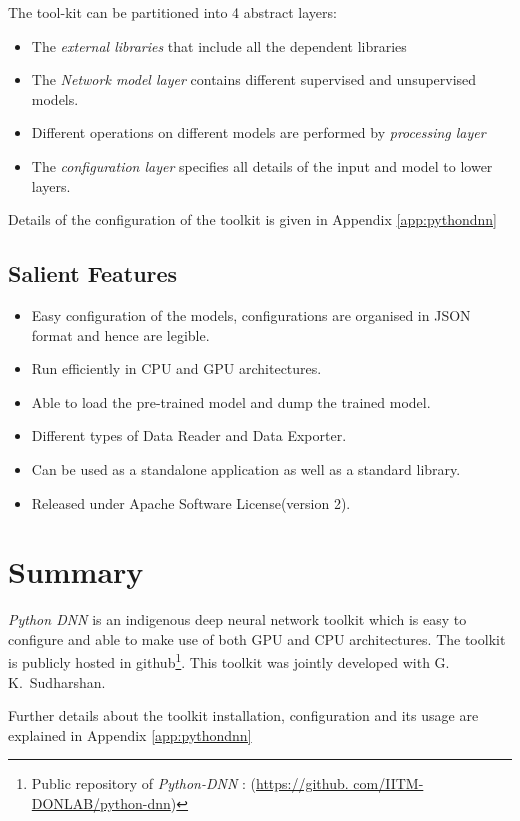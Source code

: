 \noindent The tool-kit can be partitioned into 4 abstract layers:
\begin{itemize}
\item The \textit{external libraries} that include all the dependent libraries
\item The \textit{Network model layer} contains different supervised and unsupervised models.
\item Different operations on different models are performed by \textit{processing layer}
\item The \textit{configuration layer} specifies all details of the input and model to lower layers.
\end{itemize}

Details of the configuration of the toolkit is given in Appendix \ref{app:pythondnn}

\subsection{Salient Features}
\label{sec:python-dnnFeatures}
\begin{itemize}
\item Easy configuration of the models, configurations
are organised in JSON format and hence are legible.
\item Run efficiently in CPU and GPU architectures.
\item Able to load the pre-trained model and dump the trained model.
\item Different types of Data Reader and Data Exporter.
\item Can be used as a standalone application as well as a standard  library.
\item Released under Apache Software License(version 2).\\
\end{itemize}

\section{Summary}
\textit{Python DNN} is an indigenous deep neural network toolkit which is easy to configure and able to make use of both GPU and CPU architectures. The toolkit is publicly hosted in github\footnote{Public repository of \textit{Python-DNN} : (\url{https://github. com/IITM-DONLAB/python-dnn})}. This toolkit was jointly developed with G.~ K.~Sudharshan.

Further details about the toolkit installation, configuration and its usage are explained in Appendix \ref{app:pythondnn}
